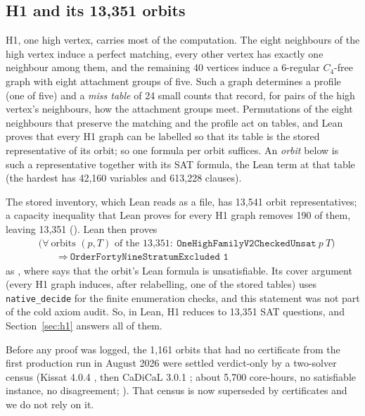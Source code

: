 \documentclass{anvil-paper}
\newcommand{\repobase}{https://github.com/rjwalters/lean-genius/blob/erdos85/integration}
\newcommand{\repofile}[2]{\href{\repobase/#1}{\lean{#2}}}
\newcommand{\rp}{research/problems/erdos-85-wip-01}
\theoremstyle{definition}
\begin{document}
\subsection{H1 and its 13,351 orbits}\label{sec:h1-structure}

H1, one high vertex, carries most of the computation. The eight neighbours of the high vertex induce a perfect matching, every other vertex has exactly one neighbour among them, and the remaining 40 vertices induce a 6-regular $C_4$-free graph with eight attachment groups of five. Such a graph determines a profile (one of five) and a \emph{miss table} of 24 small counts that record, for pairs of the high vertex's neighbours, how the attachment groups meet. Permutations of the eight neighbours that preserve the matching and the profile act on tables, and Lean proves that every H1 graph can be labelled so that its table is the stored representative of its orbit; so one formula per orbit suffices. An \emph{orbit} below is such a representative together with its SAT formula, the Lean term  at that table (the hardest has 42,160 variables and 613,228 clauses).

The stored inventory, which Lean reads as a file, has 13,541 orbit representatives; a capacity inequality that Lean proves for every H1 graph removes 190 of them, leaving 13,351 (). Lean then proves
\[
\begin{aligned}
&\bigl(\forall\ \text{orbits } (p,T) \text{ of the 13,351}:\ \texttt{OneHighFamilyV2CheckedUnsat}\ p\ T\bigr)\\
&\qquad\Longrightarrow\ \texttt{OrderFortyNineStratumExcluded 1}
\end{aligned}
\]
as , where  says that the orbit's Lean formula is unsatisfiable. Its cover argument (every H1 graph induces, after relabelling, one of the stored tables) uses \texttt{native\_decide} for the finite enumeration checks, and this statement was not part of the cold axiom audit. So, in Lean, H1 reduces to 13,351 SAT questions, and Section~\ref{sec:h1} answers all of them.

Before any proof was logged, the 1,161 orbits that had no certificate from the first production run in August 2026 were settled verdict-only by a two-solver census (Kissat 4.0.4 \citep{biere2024kissat}, then CaDiCaL 3.0.1 \citep{biere2020cadical}; about 5,700 core-hours, no satisfiable instance, no disagreement; \repofile{\rp/phase_b_h1_census_20260927/CENSUS.md}{CENSUS.md}). That census is now superseded by certificates and we do not rely on it.
\end{document}
